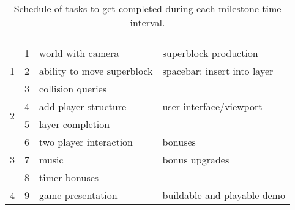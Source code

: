 \begin{table}[!h]
	\centering
	\begin{tabular}{ | l | l | p{6cm} p{6cm} |}
		\hline
			& & & \\[1pt]
			\tb{Milestone} & \tb{Week} & \multicolumn{2}{c|}{\tb{Tasks}} \\[10pt]
		\hline
			\multirow{3}{*}{1} & 1 & world with camera & superblock production \\
			& 2 & ability to move superblock & spacebar: insert into layer \\
			& 3 & collision queries & \\
		\hline
			\multirow{2}{*}{2} & 4 & add player structure & user interface/viewport \\
			& 5 & layer completion & \\
		\hline
			\multirow{3}{*}{3} & 6 & two player interaction & bonuses \\
			& 7 & music & bonus upgrades \\
			& 8 & timer bonuses & \\
		\hline
			4 & 9 & game presentation & buildable and playable demo \\
		\hline
	\end{tabular}
	\caption{Schedule of tasks to get completed during each milestone time interval.}
	\label{tab:milestones}
\end{table}


